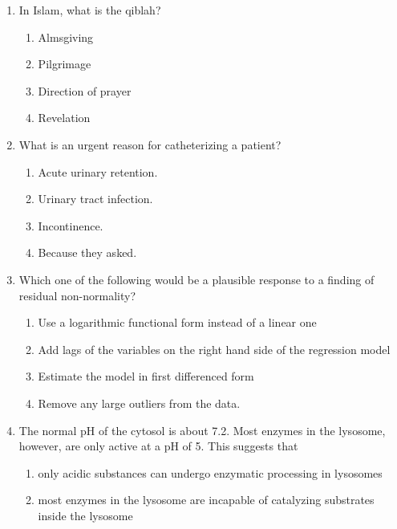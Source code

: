 \documentclass[12pt]{article}
\begin{document}
\begin{enumerate}[label=\arabic*.]
\begin{enumerate}[label=(\alph*)]
    \item To be prepared for storms
    \item To learn how fossils are formed
    \item To see changing phases of the Moon
    \item To find ways for animals to live longer
\end{enumerate}
\item In Islam, what is the qiblah?
\begin{enumerate}[label=(\alph*)]
    \item Almsgiving
    \item Pilgrimage
    \item Direction of prayer
    \item Revelation
\end{enumerate}
\item What is an urgent reason for catheterizing a patient?
\begin{enumerate}[label=(\alph*)]
    \item Acute urinary retention.
    \item Urinary tract infection.
    \item Incontinence.
    \item Because they asked.
\end{enumerate}
\item Which one of the following would be a plausible response to a finding of residual non-normality?
\begin{enumerate}[label=(\alph*)]
    \item Use a logarithmic functional form instead of a linear one
    \item Add lags of the variables on the right hand side of the regression model
    \item Estimate the model in first differenced form
    \item Remove any large outliers from the data.
\end{enumerate}
\item The normal pH of the cytosol is about 7.2. Most enzymes in the lysosome, however, are only active at a pH of 5. This suggests that
\begin{enumerate}[label=(\alph*)]
    \item only acidic substances can undergo enzymatic processing in lysosomes
    \item most enzymes in the lysosome are incapable of catalyzing substrates inside the lysosome

\end{enumerate}
\end{enumerate}
\end{document}
